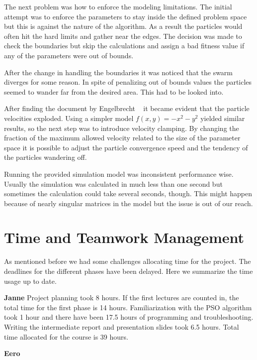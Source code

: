\documentclass[twoside]{article}
\begin{document}
\begin{multicols}{2}
The next problem was how to enforce the modeling limitations. The initial attempt was to enforce the parameters to stay inside the defined problem space but this is against the nature of the algorithm. As a result the particles would often hit the hard limits and gather near the edges. The decision was made to check the boundaries but skip the calculations and assign a bad fitness value if any of the parameters were out of bounds.

After the change in handling the boundaries it was noticed that the swarm diverges for some reason. In spite of penalizing out of bounds values the particles seemed to wander far from the desired area. This had to be looked into.

After finding the document by Engelbrecht ~\cite{pitfalls} it became evident that the particle velocities exploded. Using a simpler model $f(x,y)=-x^2-y^2$ yielded similar results, so the next step was to introduce velocity clamping. By changing the fraction of the maximum allowed velocity related to the size of the parameter space it is possible to adjust the particle convergence speed and the tendency of the particles wandering off.


Running the provided simulation model was inconsistent performance wise. Usually the simulation was calculated in much less than one second but sometimes the calculation could take several seconds, though. This might happen because of nearly singular matrices in the model but the issue is out of our reach.



\section{Time and Teamwork Management}

As mentioned before we had some challenges allocating time for the project. The deadlines for the different phases have been delayed. Here we summarize the time usage up to date.

\textbf{Janne} Project planning took 8 hours. If the first lectures are counted in, the total time for the first phase is 14 hours. Familiarization with the PSO algorithm took 1 hour and there have been 17.5 hours of programming and troubleshooting. Writing the intermediate report and presentation slides took 6.5 hours. Total time allocated for the course is 39 hours.

\textbf{Eero}








\end{multicols}
\end{document}
